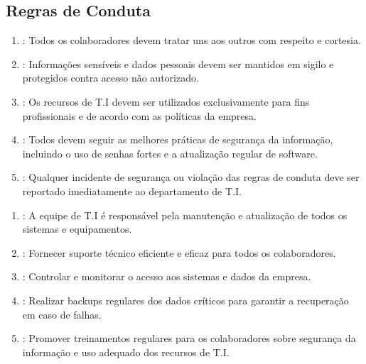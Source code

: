 \documentclass[letterpaper,10pt,portuges]{sphinxmanual}
\begin{document}
\subsection{Regras de Conduta}
\label{\detokenize{regras:regras-de-conduta}}\begin{enumerate}
%
\item {} 
\sphinxAtStartPar
{}: Todos os colaboradores devem tratar uns aos outros com respeito e cortesia.

\item {} 
\sphinxAtStartPar
{}: Informações sensíveis e dados pessoais devem ser mantidos em sigilo e protegidos contra acesso não autorizado.

\item {} 
\sphinxAtStartPar
{}: Os recursos de T.I devem ser utilizados exclusivamente para fins profissionais e de acordo com as políticas da empresa.

\item {} 
\sphinxAtStartPar
{}: Todos devem seguir as melhores práticas de segurança da informação, incluindo o uso de senhas fortes e a atualização regular de software.

\item {} 
\sphinxAtStartPar
{}: Qualquer incidente de segurança ou violação das regras de conduta deve ser reportado imediatamente ao departamento de T.I.

\end{enumerate}
\begin{enumerate}
%
\item {} 
\sphinxAtStartPar
{}: A equipe de T.I é responsável pela manutenção e atualização de todos os sistemas e equipamentos.

\item {} 
\sphinxAtStartPar
{}: Fornecer suporte técnico eficiente e eficaz para todos os colaboradores.

\item {} 
\sphinxAtStartPar
{}: Controlar e monitorar o acesso aos sistemas e dados da empresa.

\item {} 
\sphinxAtStartPar
{}: Realizar backups regulares dos dados críticos para garantir a recuperação em caso de falhas.

\item {} 
\sphinxAtStartPar
{}: Promover treinamentos regulares para os colaboradores sobre segurança da informação e uso adequado dos recursos de T.I.

\end{enumerate}
\end{document}
